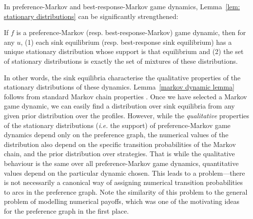 \documentclass[preprint,authoryear]{elsarticle}
\begin{document}
In preference-Markov and best-response-Markov game dynamics, Lemma~\ref{lem: stationary distributions} can be significantly strengthened:
\begin{lem} \label{markov dynamic lemma}
If $f$ is a preference-Markov (resp. best-response-Markov) game dynamic, then for any $u$, (1) each sink equilibrium (resp. best-response sink equilibrium) has a unique stationary distribution whose support is that equilibrium and (2) the set of stationary distributions is exactly the set of mixtures of these distributions.
\end{lem}
In other words, the sink equilibria characterise the qualitative properties of the stationary distributions of these dynamics. Lemma~\ref{markov dynamic lemma} follows from standard Markov chain properties \citep{kemeny1969finite}. Once we have selected a Markov game dynamic, we can easily find a distribution over sink equilibria from any given prior distribution over the profiles. %
However, while the \emph{qualitative} properties of the stationary distributions (\emph{i.e.} the support) of preference-Markov game dynamics depend only on the preference graph, the numerical values of the distribution also depend on the specific transition probabilities of the Markov chain, and the prior distribution over strategies. That is while the qualitative behaviour is the same over all preference-Markov game dynamics, quantitative values depend on the particular dynamic chosen. This leads to a problem---there is not necessarily a canonical way of assigning numerical transition probabilities to arcs in the preference graph. Note the similarity of this problem to the general problem of modelling numerical payoffs, which was one of the motivating ideas for the preference graph in the first place.
\end{document}
